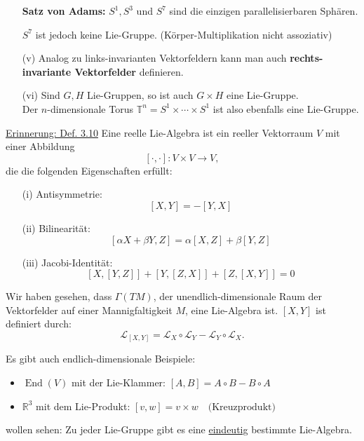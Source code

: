 \documentclass[fleqn, 12pt, letterpaper]{article}
\begin{document}
\begin{itemize}
    \textbf{Satz von Adams:} \( S^1, S^3 \) und \( S^7 \) sind die einzigen parallelisierbaren Sphären. 

    \( S^7 \) ist jedoch keine Lie-Gruppe. (Körper-Multiplikation nicht assoziativ)

    \item[(v)] Analog zu links-invarianten Vektorfeldern kann man auch \textbf{rechts-invariante Vektorfelder} definieren.
    
    \item[(vi)] Sind \( G, H \) Lie-Gruppen, so ist auch \( G \times H \) eine Lie-Gruppe. \\
    Der \( n \)-dimensionale Torus \( \mathbb{T}^n = S^1 \times \cdots \times S^1 \) ist also ebenfalls eine Lie-Gruppe.
\end{itemize}

\underline{Erinnerung: Def. 3.10}
Eine reelle Lie-Algebra ist ein reeller Vektorraum \( V \) mit einer Abbildung
\[
[\cdot, \cdot] : V \times V \longrightarrow V,
\]
die die folgenden Eigenschaften erfüllt:
\begin{itemize}
    \item[(i)] Antisymmetrie: \[ [X, Y] = -[Y, X] \]
    \item[(ii)] Bilinearität: \[ [\alpha X + \beta Y, Z] = \alpha [X, Z] + \beta [Y, Z] \]
    \item[(iii)] Jacobi-Identität: \[ [X, [Y, Z]] + [Y, [Z, X]] + [Z, [X, Y]] = 0 \]
\end{itemize}

Wir haben gesehen, dass \( \Gamma(TM) \), der unendlich-dimensionale Raum der Vektorfelder auf einer Mannigfaltigkeit \( M \), eine Lie-Algebra ist. \([X, Y]\) ist definiert durch:
\[
\mathcal{L}_{[X, Y]} = \mathcal{L}_X \circ \mathcal{L}_Y - \mathcal{L}_Y \circ \mathcal{L}_X.
\]


Es gibt auch endlich-dimensionale Beispiele:
\begin{itemize}
    \item \( \operatorname{End}(V) \) mit der Lie-Klammer:
    \(
    [A, B] = A \circ B - B \circ A
    \)

    \item \( \mathbb{R}^3 \) mit dem Lie-Produkt:
    \(
    [v, w] = v \times w \quad \text{(Kreuzprodukt)}
    \)
\end{itemize}

wollen sehen: Zu jeder Lie-Gruppe gibt es eine \underline{eindeutig} bestimmte Lie-Algebra.
\end{document}
